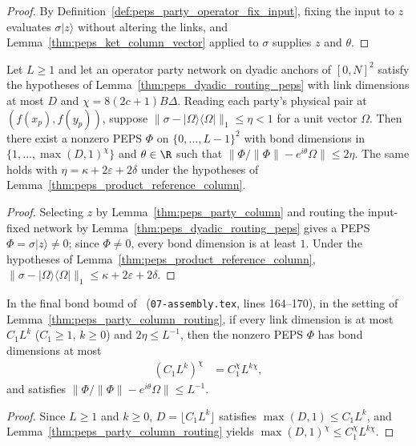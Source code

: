 \begin{proof}\leanok
    By Definition~\ref{def:peps_party_operator_fix_input}, fixing the input to $z$ evaluates $\sigma|z\rangle$ without altering the links, and Lemma~\ref{thm:peps_ket_column_vector} applied to $\sigma$ supplies $z$ and $\theta$.
\end{proof}

\begin{lemma}
    \label{thm:peps_party_column_routing}
    \leanok
    Let $L\ge1$ and let an operator party network on dyadic anchors of $[0,N]^2$
    satisfy the hypotheses of Lemma~\ref{thm:peps_dyadic_routing_peps}
    with link dimensions at most $D$ and $\chi=8(2c+1)B\Delta$. Reading each party's physical pair at $(f(x_p),f(y_p))$, suppose
    $\lVert\sigma-|\Omega\rangle\langle\Omega|\rVert_1\le\eta<1$ for a unit vector
    $\Omega$. Then there exist a nonzero PEPS $\Phi$ on $\{0,\ldots,L-1\}^2$
    with bond dimensions in $\{1,\ldots,{\max(D,1)}^\chi\}$ and $\theta\in\R$ such that $\lVert\Phi/\lVert\Phi\rVert-e^{i\theta}\Omega\rVert\le2\eta$.
    The same holds with $\eta=\kappa+2\varepsilon+2\delta$ under the
    hypotheses of Lemma~\ref{thm:peps_product_reference_column}.
\end{lemma}

\begin{proof}\leanok
    Selecting $z$ by Lemma~\ref{thm:peps_party_column}
    and routing the input-fixed network by
    Lemma~\ref{thm:peps_dyadic_routing_peps} gives a PEPS $\Phi=\sigma|z\rangle\ne0$; since $\Phi\ne0$, every bond dimension is at least $1$. Under the hypotheses of
    Lemma~\ref{thm:peps_product_reference_column},
    $\lVert\sigma-|\Omega\rangle\langle\Omega|\rVert_1\le\kappa+2\varepsilon+2\delta$.
\end{proof}

\begin{lemma}
    \label{thm:peps_party_column_routing_polynomial}
    \leanok
    In the final bond bound of~\cite[Section~8.3]{OpenAI2026PolynomialPEPS}
    (\texttt{07-assembly.tex}, lines 164--170), in the
    setting of Lemma~\ref{thm:peps_party_column_routing}, if
    every link dimension is at most $C_1L^k$ ($C_1\ge1$, $k\ge0$) and
    $2\eta\le L^{-1}$, then the nonzero PEPS $\Phi$ has bond dimensions at most
    \begin{align}
        {(C_1L^k)}^\chi & =C_1^\chi L^{k\chi},
    \end{align}
    and satisfies $\lVert\Phi/\lVert\Phi\rVert-e^{i\theta}\Omega\rVert\le L^{-1}$.
\end{lemma}

\begin{proof}\leanok
    Since $L\ge1$ and $k\ge0$, $D=\lfloor C_1L^k\rfloor$ satisfies $\max(D,1)\le C_1L^k$, and Lemma~\ref{thm:peps_party_column_routing} yields ${\max(D,1)}^\chi\le C_1^\chi L^{k\chi}$.
\end{proof}
